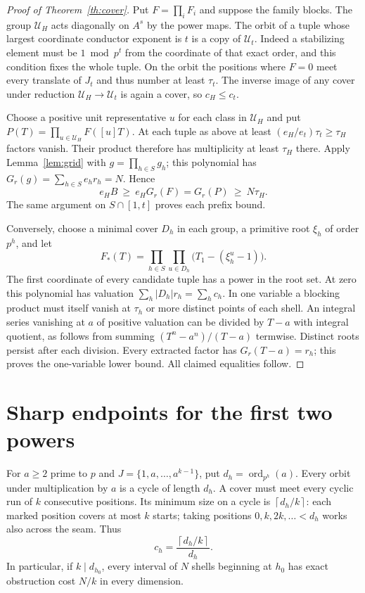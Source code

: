 \documentclass[11pt]{article}
\theoremstyle{definition}\newtheorem{example}[theorem]{Example}
\newcommand{\U}{\mathcal U}
\newcommand{\ord}{\operatorname{ord}}
\newcommand{\ceil}[1]{\left\lceil #1\right\rceil}
\begin{document}
\begin{proof}[Proof of Theorem~\ref{th:cover}]
Put $F=\prod_i F_i$ and suppose the family blocks. The group $\U_H$ acts
diagonally on $A^s$ by the power maps. The orbit of a tuple whose largest
coordinate conductor exponent is $t$ is a copy of $\U_t$. Indeed a
stabilizing element must be $1\bmod p^t$ from the coordinate of that exact
order, and this condition fixes the whole tuple. On the orbit the positions
where $F=0$ meet every translate of $J_t$ and thus number at least $\tau_t$.
The inverse image of any cover under reduction $\U_H\to\U_t$ is again a
cover, so $c_H\le c_t$.

Choose a positive unit representative $u$ for each class in $\U_H$ and put
$P(T)=\prod_{u\in\U_H}F([u]T)$. At each tuple as above at least
$(e_H/e_t)\tau_t\ge\tau_H$ factors vanish. Their product therefore has
multiplicity at least $\tau_H$ there. Apply Lemma~\ref{lem:grid} with
$g=\prod_{h\in S}g_h$; this polynomial has $G_r(g)=\sum_{h\in S}e_hr_h=N$.
Hence
\[
 e_H B\ \ge\ e_H G_r(F)=G_r(P)\ \ge\ N\tau_H .
\]
The same argument on $S\cap[1,t]$ proves each prefix bound.

Conversely, choose a minimal cover $D_h$ in each group, a primitive root
$\xi_h$ of order $p^h$, and let
\[
 F_*(T)=\prod_{h\in S}\prod_{u\in D_h}\bigl(T_1-(\xi_h^u-1)\bigr).
\]
The first coordinate of every candidate tuple has a power in the root set.
At zero this polynomial has valuation $\sum_h |D_h|r_h=\sum_h c_h$.
In one variable a blocking product must itself vanish at $\tau_h$ or more
distinct points of each shell. An integral series vanishing at $a$ of
positive valuation can be divided by $T-a$ with integral quotient, as
follows from summing $(T^n-a^n)/(T-a)$ termwise. Distinct roots persist after
each division. Every extracted factor has $G_r(T-a)=r_h$; this proves the
one-variable lower bound. All claimed equalities follow.
\end{proof}

\section{Sharp endpoints for the first two powers}\label{sec:two}
For $a\ge2$ prime to $p$ and $J=\{1,a,\ldots,a^{k-1}\}$, put
$d_h=\ord_{p^h}(a)$. Every orbit under multiplication by $a$ is a cycle of
length $d_h$. A cover must meet every cyclic run of $k$ consecutive
positions. Its minimum size on a cycle is $\ceil{d_h/k}$: each marked
position covers at most $k$ starts; taking positions $0,k,2k,\ldots<d_h$
works also across the seam. Thus
\[
 c_h=\frac{\ceil{d_h/k}}{d_h}.
\]
In particular, if $k\mid d_{h_0}$, every interval of $N$ shells beginning
at $h_0$ has exact obstruction cost $N/k$ in every dimension.
\end{document}
